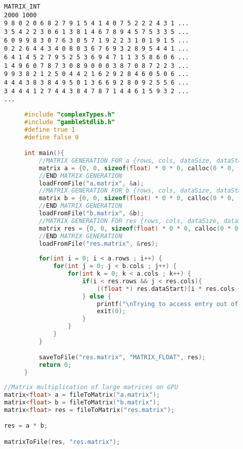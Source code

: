 \begin{lstlisting}[caption={Sample of file containing a matrix, some data omitted},frame=tlrb]
MATRIX_INT
2000 1000
9 8 0 2 0 6 8 2 7 9 1 5 4 1 4 0 7 5 2 2 2 4 3 1 ... 
3 5 4 2 2 3 0 6 1 3 8 1 4 6 7 8 9 4 5 7 5 3 3 5 ... 
6 0 9 9 8 3 0 7 6 3 0 5 7 1 9 2 2 3 1 0 1 9 1 5 ...
0 2 2 6 4 4 3 4 0 8 0 3 6 7 6 9 3 2 8 9 5 4 4 1 ...
6 4 1 4 5 2 7 9 5 2 5 3 6 9 4 7 1 1 3 5 8 6 0 6 ...
1 4 9 6 0 7 8 7 3 0 8 9 0 0 0 3 8 7 0 8 7 2 2 3 ...
9 9 3 8 2 1 2 5 0 4 4 2 1 6 2 9 2 8 4 6 0 5 0 6 ...
4 4 4 3 8 3 8 4 9 5 0 1 3 6 6 9 2 8 0 9 2 5 5 6 ...
3 4 4 4 1 2 7 4 4 3 8 4 7 8 7 1 4 4 6 1 5 9 3 2 ...
...
\end{lstlisting}
\begin{figure}
\begin{lstlisting}[language=C,caption={C-code for sequential matrix multiplication using the CPU},frame=tlrb]
#include "complexTypes.h"
#include "gambleStdlib.h"
#define true 1
#define false 0

int main(){
    //MATRIX GENERATION FOR a {rows, cols, dataSize, dataStart}
    matrix a = {0, 0, sizeof(float) * 0 * 0, calloc(0 * 0, sizeof(float))};
    //END MATRIX GENERATION
    loadFromFile("a.matrix", &a);
    //MATRIX GENERATION FOR b {rows, cols, dataSize, dataStart}
    matrix b = {0, 0, sizeof(float) * 0 * 0, calloc(0 * 0, sizeof(float))};
    //END MATRIX GENERATION
    loadFromFile("b.matrix", &b);
    //MATRIX GENERATION FOR res {rows, cols, dataSize, dataStart}
    matrix res = {0, 0, sizeof(float) * 0 * 0, calloc(0 * 0, sizeof(float))};
    //END MATRIX GENERATION
    loadFromFile("res.matrix", &res);
    
    for(int i = 0; i < a.rows ; i++) {
        for(int j = 0; j < b.cols ; j++) {
            for(int k = 0; k < a.cols ; k++) {
                if(i < res.rows && j < res.cols){
                    ((float *) res.dataStart)[i * res.cols + j] += ((float *) a.dataStart)[i * a.cols + k] * ((float *) b.dataStart)[k * b.cols + j];
                } else {
                    printf("\nTrying to access entry out of bounds in %s\n", "res");
                    exit(0);
                }             
            }
        }
    }

    saveToFile("res.matrix", "MATRIX_FLOAT", res);
    return 0;
}
\end{lstlisting}
\end{figure}

\begin{lstlisting}[language=C,caption={\gls{gamble} sourcecode for matrix multiplication using the GPU},frame=tlrb]
//Matrix multiplication of large matrices on GPU
matrix<float> a = fileToMatrix("a.matrix");
matrix<float> b = fileToMatrix("b.matrix");
matrix<float> res = fileToMatrix("res.matrix");

res = a * b;

matrixToFile(res, "res.matrix");
\end{lstlisting}

